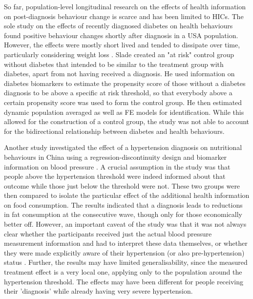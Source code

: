 So far, population-level longitudinal research on the effects of health information on post-diagnosis behaviour change is scarce and has been limited to \acp{HIC}. The sole study on the effects of recently diagnosed diabetes on health behaviours found positive behaviour changes shortly after diagnosis in a USA population. However, the effects were mostly short lived and tended to dissipate over time, particularly considering weight loss \autocite{Slade2012}. Slade created an "at risk" control group without diabetes that intended to be similar to the treatment group with diabetes, apart from not having received a diagnosis. He used information on diabetes biomarkers to estimate the propensity score of those without a diabetes diagnosis to be above a specific at risk threshold, so that everybody above a certain propensity score was used to form the control group. He then estimated dynamic population averaged as well as \ac{FE} models for identification. While this allowed for the construction of a control group, the study was not able to account for the bidirectional relationship between diabetes and health behaviours.

Another study investigated the effect of a hypertension diagnosis on nutritional behaviours in China using a regression-discontinuity design and biomarker information on blood pressure \autocite{Zhao2013a}. A crucial assumption in the study was that people above the hypertension threshold were indeed informed about that outcome while those just below the threshold were not. These two groups were then compared to isolate the particular effect of the additional health information on food consumption. The results indicated that a diagnosis leads to reductions in fat consumption at the consecutive wave, though only for those economically better off. However, an important caveat of the study was that it was not always clear whether the participants received just the actual blood pressure measurement information and had to interpret these data themselves, or whether they were made explicitly aware of their hypertension (or also pre-hypertension) status \autocite{Zhao2013a}. Further, the results may have limited generalisability, since the measured treatment effect is a very local one, applying only to the population around the hypertension threshold. The effects may have been different for people receiving their 'diagnosis' while already having very severe hypertension.


